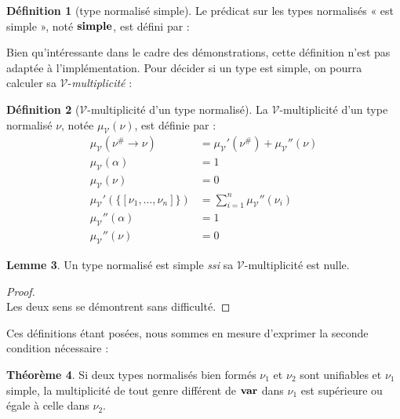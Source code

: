 \documentclass[a4paper]{report}
\newenvironment{preuve} 
  {\begin{proof}~\\} 
  {\end{proof}}
\theoremstyle{definition}
\newtheorem{theoreme}{Théorème}
\newtheorem{definition}[theoreme]{Définition}
\newtheorem{lemme}[theoreme]{Lemme}
\newcommand{\interval}[2]{[\![#1\,;#2]\!]}
\newcommand{\mset}[1]{\{\![#1]\!\}}
\newcommand{\ssi}{\textit{ssi}\xspace}
\newcommand{\V}{\mathscr{V}}
\begin{document}
\begin{definition}[type normalisé simple]
  Le prédicat sur les types normalisés « est simple », noté $\bold{simple}$, est défini par :
\end{definition}

Bien qu'intéressante dans le cadre des démonstrations, cette définition n'est pas adaptée à l'implémentation. Pour décider si un type est simple, on pourra calculer sa $\V$-\emph{multiplicité} :

\begin{definition}[$\V$-multiplicité d'un type normalisé]
  La $\V$-multiplicité d'un type normalisé $\nu$, notée $\mu_\V (\nu)$, est définie par :
  \begin{align*}
      \mu_\V (\nu^\# \rightarrow \nu) &=
      \mu_\V' (\nu^\#) + \mu_\V'' (\nu)
    \\
      \mu_\V (\alpha) &=
      1
    \\
      \mu_\V (\nu) &=
      0
    \\
      \mu_\V' (\mset{\nu_1, \dots, \nu_n}) &=
      \sum_{i=1}^n \mu_\V'' (\nu_i)
    \\
      \mu_\V'' (\alpha) &=
      1
    \\
      \mu_\V'' (\nu) &=
      0
  \end{align*}
\end{definition}

\begin{lemme}
  Un type normalisé est simple \ssi sa $\V$-multiplicité est nulle.
\end{lemme}

\begin{preuve}
  Les deux sens se démontrent sans difficulté.
\end{preuve}

Ces définitions étant posées, nous sommes en mesure d'exprimer la seconde condition nécessaire :

\begin{theoreme} \label{thm_cond2}
  Si deux types normalisés bien formés $\nu_1$ et $\nu_2$ sont unifiables et $\nu_1$ simple, la multiplicité de tout genre différent de $\bold{var}$ dans $\nu_1$ est supérieure ou égale à celle dans $\nu_2$.
\end{theoreme}
\end{document}
